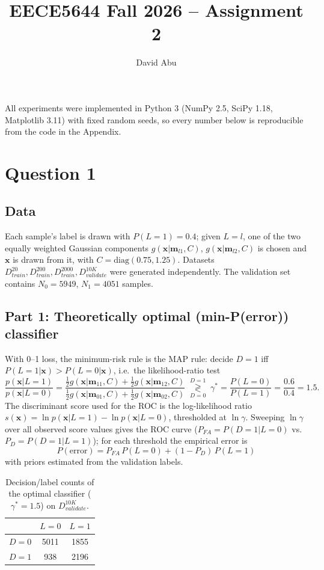 \documentclass[11pt]{article}
\title{EECE5644 Fall 2026 -- Assignment 2}
\author{David Abu}
\date{}
\newcommand{\x}{\mathbf{x}}\newcommand{\z}{\mathbf{z}}\newcommand{\w}{\mathbf{w}}
\begin{document}
\maketitle

\noindent All experiments were implemented in Python 3 (NumPy 2.5, SciPy 1.18, Matplotlib 3.11) with fixed random seeds, so every number below is reproducible from the code in the Appendix.

\section*{Question 1}

\subsection*{Data}
Each sample's label is drawn with $P(L{=}1)=0.4$; given $L=l$, one of the two equally weighted Gaussian components $g(\x|\mathbf m_{l1},C)$, $g(\x|\mathbf m_{l2},C)$ is chosen and $\x$ is drawn from it, with $C=\mathrm{diag}(0.75,1.25)$. Datasets $D^{20}_{train},D^{200}_{train},D^{2000}_{train},D^{10K}_{validate}$ were generated independently. The validation set contains $N_0=5949$, $N_1=4051$ samples.

\subsection*{Part 1: Theoretically optimal (min-P(error)) classifier}
With 0--1 loss, the minimum-risk rule is the MAP rule: decide $D=1$ iff $P(L{=}1|\x)>P(L{=}0|\x)$, i.e.\ the likelihood-ratio test
\[
\frac{p(\x|L{=}1)}{p(\x|L{=}0)}
=\frac{\tfrac12 g(\x|\mathbf m_{11},C)+\tfrac12 g(\x|\mathbf m_{12},C)}{\tfrac12 g(\x|\mathbf m_{01},C)+\tfrac12 g(\x|\mathbf m_{02},C)}
\;\underset{D=0}{\overset{D=1}{\gtrless}}\;\gamma^\ast=\frac{P(L{=}0)}{P(L{=}1)}=\frac{0.6}{0.4}=1.5 .
\]
The discriminant score used for the ROC is the log-likelihood ratio $s(\x)=\ln p(\x|L{=}1)-\ln p(\x|L{=}0)$, thresholded at $\ln\gamma$. Sweeping $\ln\gamma$ over all observed score values gives the ROC curve ($P_{FA}=P(D{=}1|L{=}0)$ vs.\ $P_D=P(D{=}1|L{=}1)$); for each threshold the empirical error is
\[P(\text{error})=P_{FA}\,P(L{=}0)+(1-P_D)\,P(L{=}1)\]
with priors estimated from the validation labels.

\begin{table}[H]\centering
\begin{tabular}{lcc}\toprule
 & $L=0$ & $L=1$\\\midrule
$D=0$ & 5011 & 1855\\
$D=1$ & 938 & 2196\\\bottomrule
\end{tabular}
\caption{Decision/label counts of the optimal classifier ($\gamma^\ast=1.5$) on $D^{10K}_{validate}$.}
\end{table}
\end{document}
